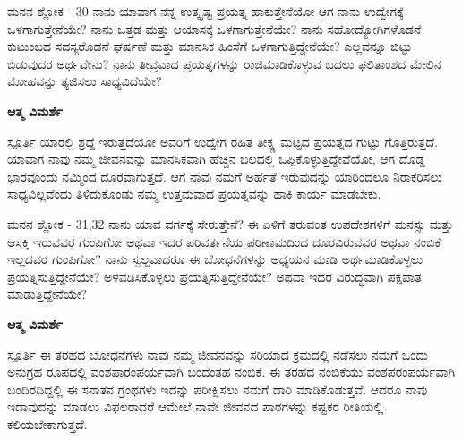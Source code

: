 \newpage
\begin{mananam}{\mananamfont ಮನನ ಶ್ಲೋಕ - \textenglish{30}}
\footnotesize \mananamtext ನಾನು ಯಾವಾಗ ನನ್ನ ಉತ್ಕೃಷ್ಟ ಪ್ರಯತ್ನ ಹಾಕುತ್ತೇನೆಯೋ ಆಗ ನಾನು ಉದ್ವೇಗಕ್ಕೆ ಒಳಗಾಗುತ್ತೇನೆಯೇ? ನಾನು ಒತ್ತಡ ಮತ್ತು ಆಯಾಸಕ್ಕೆ ಒಳಗಾಗುತ್ತೇನೆಯೇ?  ನಾನು ಸಹೋದ್ಯೋಗಿಗಳೊಡನೆ ಕುಟುಂಬದ ಸದಸ್ಯರೊಡನೆ ಘರ್ಷಣೆ ಮತ್ತು ಮಾನಸಿಕ ಹಿಂಸೆಗೆ ಒಳಗಾಗುತ್ತಿದ್ದೇನೆಯೇ? ಎಲ್ಲವನ್ನೂ ಬಿಟ್ಟು ಬಿಡುವುದರ ಅರ್ಥವೇನು? ನಾನು ತೀವ್ರವಾದ ಪ್ರಯತ್ನಗಳನ್ನು ರಾಜಿಮಾಡಿಕೊಳ್ಳುವ ಬದಲು ಫಲಿತಾಂಶದ ಮೇಲಿನ ಮೋಹವನ್ನು ತ್ಯಜಿಸಲು ಸಾಧ್ಯವಿದೆಯೇ?
\end{mananam}
\WritingHand\enspace\textbf{ಆತ್ಮ ವಿಮರ್ಶೆ}\\
\begin{inspiration}{\mananamfont ಸ್ಪೂರ್ತಿ}
\footnotesize \mananamtext ಯಾರಲ್ಲಿ ಶ್ರದ್ದೆ ಇರುತ್ತದೆಯೋ ಅವರಿಗೆ ಉದ್ವೇಗ ರಹಿತ ತೀಕ್ಷ್ಣ  ಮಟ್ಟದ ಪ್ರಯತ್ನದ ಗುಟ್ಟು ಗೊತ್ತಿರುತ್ತದೆ. ಯಾವಾಗ ನಾವು ನಮ್ಮ ಜೀವನವನ್ನು ಮಾನಸಿಕವಾಗಿ ಹೆಚ್ಚಿನ ಬಲದಲ್ಲಿ ಒಪ್ಪಿಕೊಳ್ಳುತ್ತಿದ್ದೇವೆಯೋ, ಆಗ ದೊಡ್ಡ ಭಾರವೂಂದು ನಮ್ಮಿಂದ ದೂರವಾಗುತ್ತದೆ. ಆಗ ನಾವು ನಮಗೆ ಅರ್ಹತೆ ಇರುವುದನ್ನು ಯಾರಿಂದಲೂ ನಿರಾಕರಿಸಲು ಸಾಧ್ಯವಿಲ್ಲವೆಂದು ತಿಳಿದುಕೊಂಡು ನಮ್ಮ ಉತ್ತಮವಾದ ಪ್ರಯತ್ನವನ್ನು ಹಾಕಿ ಕಾರ್ಯ ಮಾಡಬೇಕು.
\end{inspiration}
\newpage


\newpage
\begin{mananam}{\mananamfont ಮನನ ಶ್ಲೋಕ - \textenglish{31,32}}
\footnotesize \mananamtext ನಾನು ಯಾವ ವರ್ಗಕ್ಕೆ ಸೇರುತ್ತೇನೆ? ಈ ಏಳಿಗೆ ತರುವಂತ ಉಪದೇಶಗಳಿಗೆ ಮನಸ್ಸು ಮತ್ತು ಆಸಕ್ತಿ ಇರುವವರ ಗುಂಪಿಗೋ ಅಥವಾ ಇದರ ಪರಿವರ್ತನೆಯ ಪರಿಣಾಮದಿಂದ ದೂರವಿರುವವರ ಅಥವಾ ನಂಬಿಕೆ ಇಲ್ಲದವರ ಗುಂಪಿಗೋ? ನಾನು ಸ್ವಲ್ಪವಾದರೂ ಈ ಬೋಧನೆಗಳನ್ನು ಅಧ್ಯಯನ ಮಾಡಿ ಅರ್ಥಮಾಡಿಕೊಳ್ಳಲು ಪ್ರಯತ್ನಿಸುತ್ತಿದ್ದೇನೆಯೇ? ಅಳವಡಿಸಿಕೊಳ್ಳಲು ಪ್ರಯತ್ನಿಸುತ್ತಿದ್ದೇನೆಯೇ? ಅಥವಾ ಇದರ ವಿರುದ್ಧವಾಗಿ ಪಕ್ಷಪಾತ ಮಾಡುತ್ತಿದ್ದೇನೆಯೇ?
\end{mananam}
\WritingHand\enspace\textbf{ಆತ್ಮ ವಿಮರ್ಶೆ}\\
\begin{inspiration}{\mananamfont ಸ್ಪೂರ್ತಿ}
\footnotesize \mananamtext ಈ ತರಹದ ಬೋಧನೆಗಳು ನಾವು ನಮ್ಮ ಜೀವನವನ್ನು ಸರಿಯಾದ ಕ್ರಮದಲ್ಲಿ ನಡೆಸಲು ನಮಗೆ ಒಂದು ಅನುಗ್ರಹ ರೂಪದಲ್ಲಿ ವಂಶಪಾರಂಪರ್ಯವಾಗಿ ಬಂದಂತಹ ನಂಬಿಕೆ. ಈ ತರಹದ ನಂಬಿಕೆಯು ವಂಶಪರಂಪರ್ಯವಾಗಿ ಬಂದಿರದಿದ್ದಲ್ಲಿ ಈ ಸನಾತನ ಗ್ರಂಥಗಳು ಇದನ್ನು ಪರೀಕ್ಷಿಸಲು ನಮಗೆ ದಾರಿ ಮಾಡಿಕೊಡುತ್ತವೆ. ಆದರೂ ನಾವು ಇದಾವುದನ್ನು ಮಾಡಲು ವಿಫಲರಾದರೆ ಆಮೇಲೆ ನಾವೇ ಜೀವನದ ಪಾಠಗಳನ್ನು ಕಷ್ಟಕರ ರೀತಿಯಲ್ಲಿ ಕಲಿಯಬೇಕಾಗುತ್ತದೆ. 
\end{inspiration}
\newpage

